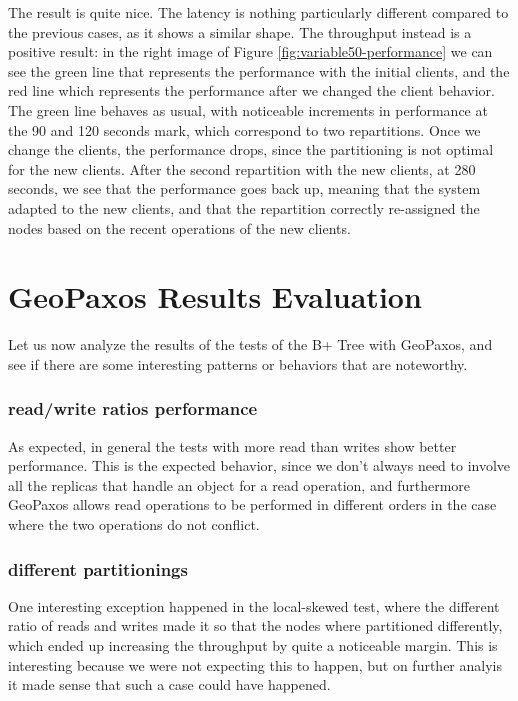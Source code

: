 The result is quite nice. The latency is nothing particularly different compared to the previous cases, as it shows a similar shape. The throughput instead is a positive result: in the right image of Figure \ref{fig:variable50-performance} we can see the green line that represents the performance with the initial clients, and the red line which represents the performance after we changed the client behavior. The green line behaves as usual, with noticeable increments in performance at the 90 and 120 seconds mark, which correspond to two repartitions. Once we change the clients, the performance drops, since the partitioning is not optimal for the new clients. After the second repartition with the new clients, at 280 seconds, we see that the performance goes back up, meaning that the system adapted to the new clients, and that the repartition correctly re-assigned the nodes based on the recent operations of the new clients.

\clearpage
\section{GeoPaxos Results Evaluation}\label{sec:geopaxos-results-evaluation}
Let us now analyze the results of the tests of the B+ Tree with GeoPaxos, and see if there are some interesting patterns or behaviors that are noteworthy.

\subsubsection{read/write ratios performance}
As expected, in general the tests with more read than writes show better performance. This is the expected behavior, since we don't always need to involve all the replicas that handle an object for a read operation, and furthermore GeoPaxos allows read operations to be performed in different orders in the case where the two operations do not conflict.

\subsubsection{different partitionings}
One interesting exception happened in the local-skewed test, where the different ratio of reads and writes made it so that the nodes where partitioned differently, which ended up increasing the throughput by quite a noticeable margin. This is interesting because we were not expecting this to happen, but on further analyis it made sense that such a case could have happened.

